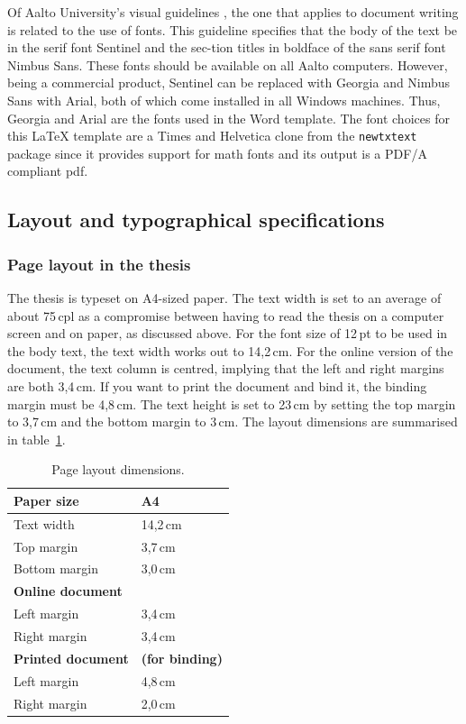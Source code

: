\documentclass[english, 12pt, a4paper, biz, utf8, a-2b, online]{aaltothesis}
\begin{document}
Of Aalto University’s visual guidelines \cite{aaltovisual}, the one that applies
to document writing is related to the use of fonts. This guideline specifies 
that the body of the text be in the serif font Sentinel and the sec-tion titles 
in boldface of the sans serif font Nimbus Sans. These fonts should be available 
on all Aalto computers. However, being a commercial product, Sentinel can be 
replaced with Georgia and Nimbus Sans with Arial, both of which come installed 
in all Windows machines. Thus, Georgia and Arial are the fonts used in the Word 
template. The font choices for this \LaTeX{} template are a Times and Helvetica 
clone from the \verb+newtxtext+ package since it provides support for math fonts
and its output is a PDF/A compliant pdf.

\subsection*{Layout and typographical specifications}
\subsubsection*{Page layout in the thesis}

The thesis is typeset on A4-sized paper. The text width is set to an average of 
about 75\,cpl as a compromise between having to read the thesis on a computer 
screen and on paper, as discussed above. For the font size of 12\,pt to be used 
in the body text, the text width works out to 14,2\,cm. For the online version 
of the document, the text column is centred, implying that the left and right 
margins are both 3,4\,cm. If you want to print the document and bind it, the 
binding margin must be 4,8\,cm. The text height is set to 23\,cm by setting the 
top margin to 3,7\,cm and the bottom margin to 3\,cm. The layout dimensions are 
summarised in table~\ref{tab:layout}.

\begin{table}[htb]
	\centering
	\caption{Page layout dimensions.}
	\label{tab:layout}
	\sffamily%
	\begin{tabular}{ll}
		\hline
		Paper size & A4\\\hline
		Text width & 14,2\,cm \\\hline
		Top margin & 3,7\,cm \\\hline
		Bottom margin & 3,0\,cm \\\hline
		\textbf{Online document} & \\\hline
		Left margin & 3,4\,cm \\\hline
		Right margin & 3,4\,cm \\\hline
		\textbf{Printed document} & \textbf{(for binding)} \\\hline
		Left margin & 4,8\,cm \\\hline
		Right margin & 2,0\,cm \\\hline
	\end{tabular}
\end{table}
\end{document}
